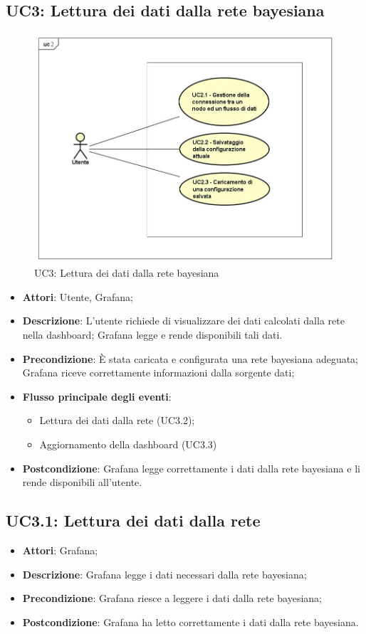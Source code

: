 \subsection{UC3: Lettura dei dati dalla rete bayesiana}
\begin{figure} [H]
	\centering
	\includegraphics[scale=0.45]{Img/UC2}
	\caption{UC3: Lettura dei dati dalla rete bayesiana}\label{}
\end{figure}
\begin{itemize}
	\item \textbf{Attori}: Utente, Grafana;
	\item \textbf{Descrizione}: L'utente richiede di visualizzare dei dati calcolati dalla rete nella dashboard; Grafana legge e rende disponibili tali dati.
	\item \textbf{Precondizione}: È stata caricata e configurata una rete bayesiana adeguata; Grafana riceve correttamente informazioni dalla sorgente dati;
	\item \textbf{Flusso principale degli eventi}:
	\begin{itemize}
		\item Lettura dei dati dalla rete (UC3.2);
		\item Aggiornamento della dashboard (UC3.3)
	\end{itemize}
	\item \textbf{Postcondizione}: Grafana legge correttamente i dati dalla rete bayesiana e li rende disponibili all'utente.
\end{itemize}
\subsection{UC3.1: Lettura dei dati dalla rete}
\begin{itemize}
	\item \textbf{Attori}: Grafana;
	\item \textbf{Descrizione}: Grafana legge i dati necessari dalla rete bayesiana;
	\item \textbf{Precondizione}: Grafana riesce a leggere i dati dalla rete bayesiana;
	\item \textbf{Postcondizione}: Grafana ha letto correttamente i dati dalla rete bayesiana.
\end{itemize}
